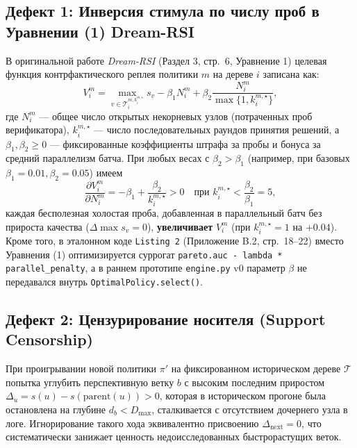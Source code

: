 \documentclass[11pt,a4paper]{article}
\begin{document}
\subsection{Дефект 1: Инверсия стимула по числу проб в Уравнении (1) Dream-RSI}
В оригинальной работе \emph{Dream-RSI} (Раздел 3, стр.~6, Уравнение 1) целевая функция контрфактического реплея политики $m$ на дереве $i$ записана как:
\begin{equation}
V_i^m = \max_{v \in \mathcal{T}_i^{m, k_i^{m,\star}}} s_v - \beta_1 N_i^m + \beta_2 \frac{N_i^m}{\max\{1, k_i^{m,\star}\}},
\end{equation}
где $N_i^m$ — общее число открытых некорневых узлов (потраченных проб верификатора), $k_i^{m,\star}$ — число последовательных раундов принятия решений, а $\beta_1, \beta_2 \ge 0$ — фиксированные коэффициенты штрафа за пробы и бонуса за средний параллелизм батча. При любых весах с $\beta_2 > \beta_1$ (например, при базовых $\beta_1 = 0.01, \beta_2 = 0.05$) имеем
\[
\frac{\partial V_i^m}{\partial N_i^m} = -\beta_1 + \frac{\beta_2}{k_i^{m,\star}} > 0 \quad \text{при } k_i^{m,\star} < \frac{\beta_2}{\beta_1} = 5,
\]
каждая бесполезная холостая проба, добавленная в параллельный батч без прироста качества ($\Delta \max s_v = 0$), \textbf{увеличивает} $V_i^m$ (при $k_i^{m,\star}=1$ на $+0.04$). Кроме того, в эталонном коде \texttt{Listing 2} (Приложение B.2, стр.~18--22) вместо Уравнения (1) оптимизируется суррогат \texttt{pareto.auc - lambda * parallel\_penalty}, а в раннем прототипе \texttt{engine.py} v0 параметр $\beta$ не передавался внутрь \texttt{OptimalPolicy.select()}.

\subsection{Дефект 2: Цензурирование носителя (Support Censorship)}
При проигрывании новой политики $\pi'$ на фиксированном историческом дереве $\mathcal{T}$ попытка углубить перспективную ветку $b$ с высоким последним приростом $\Delta_u = s(u) - s(\text{parent}(u)) > 0$, которая в историческом прогоне была остановлена на глубине $d_b < D_{\max}$, сталкивается с отсутствием дочернего узла в логе. Игнорирование такого хода эквивалентно присвоению $\Delta_{\text{next}} = 0$, что систематически занижает ценность недоисследованных быстрорастущих веток.
\end{document}

